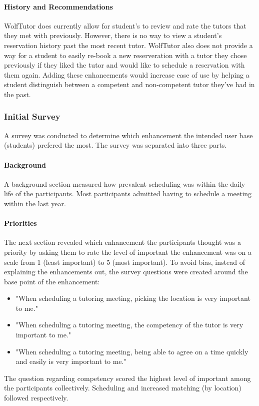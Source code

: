 \paragraph{History and Recommendations} WolfTutor does currently allow
for student's to review and rate the tutors that they met with
previously. However, there is no way to view a student's reservation
history past the most recent tutor. WolfTutor also does not provide a
way for a student to easily re-book a new reserveration with a tutor
they chose previously if they liked the tutor and would like to
schedule a reservation with them again. Adding these enhancements
would increase ease of use by helping a student distinguish between a
competent and non-competent tutor they've had in the past.

\subsubsection{Initial Survey}
\label{sec:initial-survey} A survey was conducted to determine which
enhancement the intended user base (students) prefered the most. The
survey was separated into three parts.

\paragraph{Background} A background section measured how prevalent
scheduling was within the daily life of the participants. Most
participants admitted having to schedule a meeting within the last
year.

\paragraph{Priorities} The next section revealed which enhancement the
participants thought was a priority by asking them to rate the level
of important the enhancement was on a scale from 1 (least important)
to 5 (most important). To avoid bias, instead of explaining the
enhancements out, the survey questions were created around the base
point of the enhancement:
\begin{itemize}
  \item "When scheduling a tutoring meeting, picking the location is
very important to me."
  \item "When scheduling a tutoring meeting, the competency of the
tutor is very important to me."
  \item "When scheduling a tutoring meeting, being able to agree on a
time quickly and easily is very important to me."
\end{itemize} The question regarding competency scored the highest
level of important among the participants collectively. Scheduling and
increased matching (by location) followed respectively.

